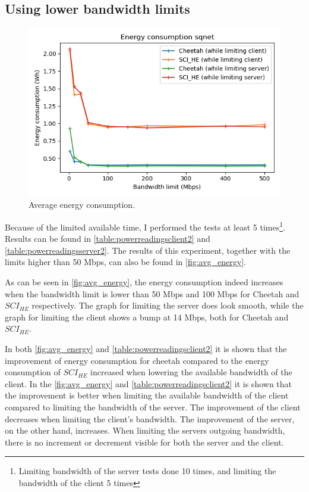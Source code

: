 \documentclass[../thesis.tex]{subfiles}
\begin{document}
\subsection{Using lower bandwidth limits}\label{subsection:lowerbw}
\begingroup
    \setlength{\intextsep}{0pt}
    \setlength{\columnsep}{0pt}
    \begin{figure}
        \centering
        \includegraphics[width=\linewidth]{Thesis/Images/graph_means.png}
        \caption{Average energy consumption.}
        \label{fig:avg_energy}
    \end{figure}
    
Because of the limited available time, I performed the tests at least 5 times\footnote{Limiting bandwidth of the server tests done 10 times, and limiting the bandwidth of the client 5 times}. Results can be found in \autoref{table:powerreadingsclient2} and \autoref{table:powerreadingsserver2}. The results of this experiment, together with the limits higher than 50 Mbps, can also be found in \autoref{fig:avg_energy}.

As can be seen in \autoref{fig:avg_energy}, the energy consumption indeed increases when the bandwidth limit is lower than 50 Mbps and 100 Mbps for Cheetah and $SCI_{HE}$ respectively. The graph for limiting the server does look smooth, while the graph for limiting the client shows a bump at 14 Mbps, both for Cheetah and $SCI_{HE}$. 

In both \autoref{fig:avg_energy} and \autoref{table:powerreadingsclient2} it is shown that the improvement of energy consumption for cheetah compared to the energy consumption of $SCI_{HE}$ increased when lowering the available bandwidth of the client. In the \autoref{fig:avg_energy} and \autoref{table:powerreadingsclient2} it is shown that the improvement is better when limiting the available bandwidth of the client compared to limiting the bandwidth of the server. The improvement of the client decreases when limiting the client's bandwidth. The improvement of the server, on the other hand, increases. When limiting the servers outgoing bandwidth, there is no increment or decrement visible for both the server and the client. 
\end{document}
